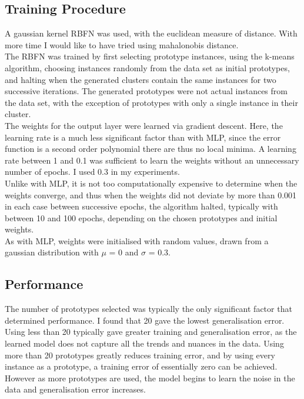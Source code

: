 \documentclass{article}
\begin{document}
\subsection*{Training Procedure}
\noindent A gaussian kernel RBFN was used, with the euclidean measure of distance. With more time I would like to have tried using mahalonobis distance. \\
\indent The RBFN was trained by first selecting prototype instances, using the k-means algorithm, choosing instances randomly from the data set as initial prototypes, and halting when the generated clusters contain the same instances for two successive iterations. The generated prototypes were not actual instances from the data set, with the exception of prototypes with only a single instance in their cluster. \\
\indent The weights for the output layer were learned via gradient descent. Here, the learning rate is a much less significant factor than with MLP, since the error function is a second order polynomial there are thus no local minima. A learning rate between 1 and 0.1 was sufficient to learn the weights without an unnecessary number of epochs. I used 0.3 in my experiments. \\
\indent Unlike with MLP, it is not too computationally expensive to determine when the weights converge, and thus when the weights did not deviate by more than 0.001 in each case between successive epochs, the algorithm halted, typically with between 10 and 100 epochs, depending on the chosen prototypes and initial weights. \\
\indent As with MLP, weights were initialised with random values, drawn from a gaussian distribution with $\mu$ = 0 and $\sigma$ = 0.3. \\
\subsection*{Performance}
The number of prototypes selected was typically the only significant factor that determined performance. I found that 20 gave the lowest generalisation error. Using less than 20 typically gave greater training and generalisation error, as the learned model does not capture all the trends and nuances in the data. Using more than 20 prototypes greatly reduces training error, and by using every instance as a prototype, a training error of essentially zero can be achieved. However as more prototypes are used, the model begins to learn the noise in the data and generalisation error increases.
\end{document}
